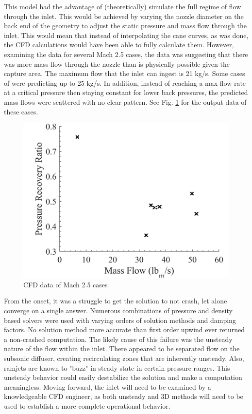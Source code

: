 This model had the advantage of (theoretically) simulate the full regime of flow through the inlet. This would be achieved by varying the nozzle diameter on the back end of the geometry to adjust the static pressure and mass flow through the inlet. This would mean that instead of interpolating the cane curves, as was done, the CFD calculations would have been able to fully calculate them. However, examining the data for several Mach 2.5 cases, the data was suggesting that there was more mass flow through the nozzle than is physically possible given the capture area. The maximum flow that the inlet can ingest is 21 kg/s. Some cases of were predicting up to 25 kg/s. In addition, instead of reaching a max flow rate at a critical pressure then staying constant for lower back pressures, the predicted mass flows were scattered with no clear pattern. See Fig. \ref{fig:FailedCane} for the output data of these cases.

\begin{figure}[H]
\centering
\includegraphics[width=.5\textwidth]{JWE_Figures/P_Recov_2_5.png}
\caption{CFD data of Mach 2.5 cases }
\label{fig:FailedCane}
\end{figure}

From the onset, it was a struggle to get the solution to not crash, let alone converge on a single answer. Numerous combinations of pressure and density based solvers were used with varying orders of solution methods and damping factors. No solution method more accurate than first order upwind ever returned a non-crashed computation. The likely cause of this failure was the unsteady nature of the flow within the inlet. There appeared to be separated flow on the subsonic diffuser, creating recirculating zones that are inherently unsteady. Also, ramjets are known to "buzz" in steady state in certain pressure ranges. This unsteady behavior could easily destabilize the solution and make a computation meaningless. Moving forward, the inlet will need to be examined by a knowledgeable CFD engineer, as both unsteady and 3D methods will need to be used to establish a more complete operational behavior.

